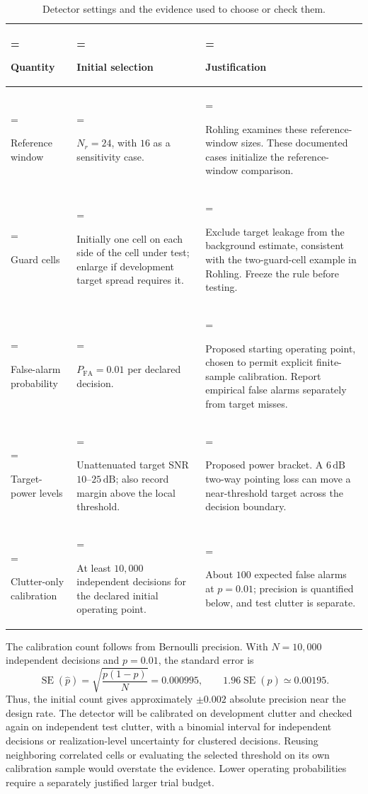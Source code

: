 \documentclass[10pt,letterpaper]{article}
\begin{document}
\begin{table}[H]
\centering
\caption{Detector settings and the evidence used to choose or check them.}
\label{tab:detector-choices}
\small
\begin{tabularx}{\textwidth}{@{}>{\hsize=0.7\hsize\linewidth=\hsize\raggedright\arraybackslash}X>{\hsize=1.0\hsize\linewidth=\hsize\raggedright\arraybackslash}X>{\hsize=1.3\hsize\linewidth=\hsize\raggedright\arraybackslash}X@{}}
\toprule
Quantity & Initial selection & Justification \\
\midrule
Reference window & $N_r=24$, with $16$ as a sensitivity case. & Rohling examines these reference-window sizes. These documented cases initialize the reference-window comparison. \cite{Rohling1983RadarCFAR} \\
Guard cells & Initially one cell on each side of the cell under test; enlarge if development target spread requires it. & Exclude target leakage from the background estimate, consistent with the two-guard-cell example in Rohling. Freeze the rule before testing. \cite{Rohling1983RadarCFAR} \\
False-alarm probability & $P_{\mathrm{FA}}=0.01$ per declared decision. & Proposed starting operating point, chosen to permit explicit finite-sample calibration. Report empirical false alarms separately from target misses. \\
Target-power levels & Unattenuated target SNR $10$--$25\,\mathrm{dB}$; also record margin above the local threshold. & Proposed power bracket. A $6\,\mathrm{dB}$ two-way pointing loss can move a near-threshold target across the decision boundary. \\
Clutter-only calibration & At least $10{,}000$ independent decisions for the declared initial operating point. & About $100$ expected false alarms at $p=0.01$; precision is quantified below, and test clutter is separate. \\
\bottomrule
\end{tabularx}
\end{table}

The calibration count follows from Bernoulli precision. With $N=10{,}000$ independent decisions and $p=0.01$, the standard error is
\begin{equation}
\label{eq:calibration-budget}
\operatorname{SE}(\widehat p)=\sqrt{\frac{p(1-p)}{N}}=0.000995,
\qquad 1.96\operatorname{SE}(\widehat p)\simeq0.00195.
\end{equation}
Thus, the initial count gives approximately $\pm0.002$ absolute precision near the design rate. The detector will be calibrated on development clutter and checked again on independent test clutter, with a binomial interval for independent decisions or realization-level uncertainty for clustered decisions. Reusing neighboring correlated cells or evaluating the selected threshold on its own calibration sample would overstate the evidence. Lower operating probabilities require a separately justified larger trial budget.
\end{document}
